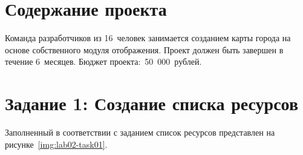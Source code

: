 \section{Содержание проекта}

Команда разработчиков из 16~человек занимается созданием карты города на основе
собственного модуля отображения. Проект должен быть завершен в течение
6~месяцев. Бюджет проекта:~50~000~рублей.

\section{Задание 1: Создание списка ресурсов}

Заполненный в соответствии с заданием список ресурсов представлен на рисунке~\ref{img:lab02-task01}.

